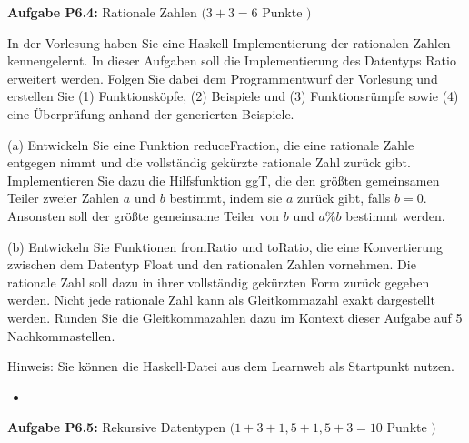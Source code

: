 \textbf{Aufgabe P6.4:} Rationale Zahlen $(3+3=6$ Punkte $)$ 

In der Vorlesung haben Sie eine Haskell-Implementierung der rationalen Zahlen kennengelernt. In dieser Aufgaben soll die Implementierung des Datentyps Ratio erweitert werden. Folgen Sie dabei dem Programmentwurf der Vorlesung und erstellen Sie (1) Funktionsköpfe, (2) Beispiele und (3) Funktionsrümpfe sowie (4) eine Überprüfung anhand der generierten Beispiele.

(a) Entwickeln Sie eine Funktion reduceFraction, die eine rationale Zahle entgegen nimmt und die vollständig gekürzte rationale Zahl zurück gibt. Implementieren Sie dazu die Hilfsfunktion ggT, die den größten gemeinsamen Teiler zweier Zahlen $a$ und $b$ bestimmt, indem sie $a$ zurück gibt, falls $b=0$. Ansonsten soll der größte gemeinsame Teiler von $b$ und $a \% b$ bestimmt werden.

(b) Entwickeln Sie Funktionen fromRatio und toRatio, die eine Konvertierung zwischen dem Datentyp Float und den rationalen Zahlen vornehmen. Die rationale Zahl soll dazu in ihrer vollständig gekürzten Form zurück gegeben werden. Nicht jede rationale Zahl kann als Gleitkommazahl exakt dargestellt werden. Runden Sie die Gleitkommazahlen dazu im Kontext dieser Aufgabe auf 5 Nachkommastellen.

Hinweis: Sie können die Haskell-Datei aus dem Learnweb als Startpunkt nutzen.

\begin{itemize}
  \item []\inputminted{Haskell}{A6_4.hs}
\end{itemize}

\newpage

\textbf{ Aufgabe P6.5:} Rekursive Datentypen $(1+3+1,5+1,5+3=10$ Punkte $)$ 

